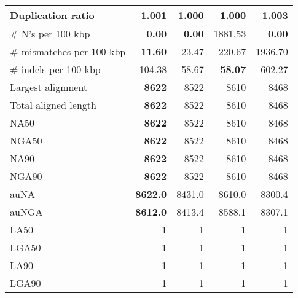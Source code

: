 \documentclass[12pt,a4paper]{article}
\begin{document}
\begin{table}[ht]
\begin{center}
\begin{tabular}{|l*{4}{|r}|}
Duplication ratio & 1.001 & {\bf 1.000} & {\bf 1.000} & 1.003 \\ \hline
\# N's per 100 kbp & {\bf 0.00} & {\bf 0.00} & 1881.53 & {\bf 0.00} \\ \hline
\# mismatches per 100 kbp & {\bf 11.60} & 23.47 & 220.67 & 1936.70 \\ \hline
\# indels per 100 kbp & 104.38 & 58.67 & {\bf 58.07} & 602.27 \\ \hline
Largest alignment & {\bf 8622} & 8522 & 8610 & 8468 \\ \hline
Total aligned length & {\bf 8622} & 8522 & 8610 & 8468 \\ \hline
NA50 & {\bf 8622} & 8522 & 8610 & 8468 \\ \hline
NGA50 & {\bf 8622} & 8522 & 8610 & 8468 \\ \hline
NA90 & {\bf 8622} & 8522 & 8610 & 8468 \\ \hline
NGA90 & {\bf 8622} & 8522 & 8610 & 8468 \\ \hline
auNA & {\bf 8622.0} & 8431.0 & 8610.0 & 8300.4 \\ \hline
auNGA & {\bf 8612.0} & 8413.4 & 8588.1 & 8307.1 \\ \hline
LA50 & 1 & 1 & 1 & 1 \\ \hline
LGA50 & 1 & 1 & 1 & 1 \\ \hline
LA90 & 1 & 1 & 1 & 1 \\ \hline
LGA90 & 1 & 1 & 1 & 1 \\ \hline
\end{tabular}
\end{center}
\end{table}
\end{document}
